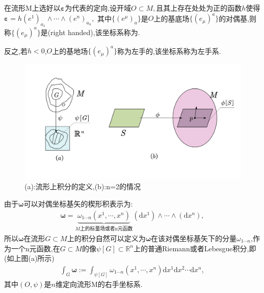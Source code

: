 在流形M上选好以$\boldsymbol{\varepsilon}$为代表的定向,设开域$O\subset M,$且其上存在处处为正的函数$h$使得$\boldsymbol{\varepsilon}=h(e^1)_{a_1}\wedge\cdots\wedge(e^n)_{a_n},$ 其中$\{(e^\mu)_a\}$是$O$上的基底场$\{(e_\mu)^a\}$的对偶基,则称$\{(e_\mu)^a\}$是(right handed),该坐标系称为.
\begin{remark}
    反之,若$h<0$,$O$上的基地场$\{(e_\mu)^a\}$称为左手的,该坐标系称为左手系.
\end{remark}
\begin{figure}[htbp]
    \centering
 \includegraphics[width=\textwidth]{Pictures/5-2.png}
    \caption{(a):流形上积分的定义,(b):n=2的情况}
    \label{fig:5-2}
\end{figure}
由于$\boldsymbol{\omega}$可以对偶坐标基矢的楔形积表示为:
\begin{align}
\boldsymbol{\omega}=\underset{M\text{上的标量场或者n元函数}}{\underbrace{\omega_{1\cdots n}(x^1,\cdots,x^n)}}(\text{d}x^{1})\wedge\cdots\wedge(\text{d}x^{n}),
\end{align}
所以$\boldsymbol{\omega}$在流形$G\subset M$上的积分自然可以定义为$\boldsymbol{\omega}$在该对偶坐标基矢下的分量$\omega_{1\cdots n}$,作为一个n元函数,在$G\subset M$的像$\psi[G]\subset \mathbb{R}^n$上的普通Riemann或者Lebesgue积分,即(如上图(a)所示)
\begin{align}
 \int_G \boldsymbol{\omega}:=\int_{\psi[G]}\omega_{1\cdots n}(x^1,\cdots,x^n)\mathrm{d}x^1\mathrm{d}x^2\cdots \mathrm{d}x^n,
\end{align}
其中$(O,\psi)$是$n$维定向流形M的右手坐标系.
